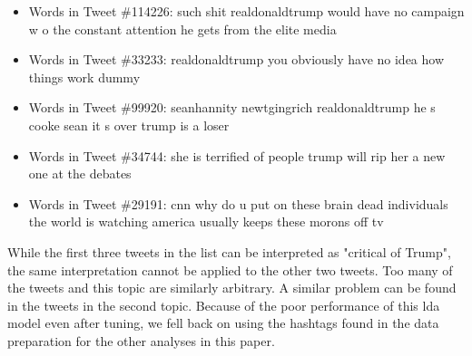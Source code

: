 \documentclass{article}
\begin{document}



  \begin{itemize}
    \item Words in Tweet \#114226: such shit realdonaldtrump would have
      no campaign w o the constant attention he gets from the elite
      media
    \item Words in Tweet \#33233:  realdonaldtrump you obviously have
      no idea how things work dummy
    \item Words in Tweet \#99920:  seanhannity newtgingrich
      realdonaldtrump he s cooke sean it s over trump is a loser
    \item Words in Tweet \#34744: she is terrified of people trump will
      rip her a new one at the debates
    \item Words in Tweet \#29191:  cnn why do u put on these brain dead individuals the world is watching america usually keeps these morons off tv 
  \end{itemize}

  While the first three tweets in the list can be interpreted as
  "critical of Trump", the same interpretation cannot be applied to
  the other two tweets. Too many of the tweets and this topic are
  similarly arbitrary. A similar problem can be found in
  the tweets in the second topic. Because of the poor performance of
  this lda model even after tuning, we fell back on using the hashtags
  found in the data preparation for the other analyses in this paper.    
\end{document}
